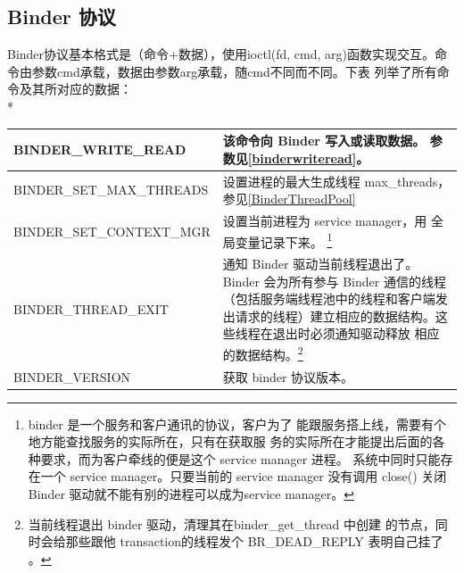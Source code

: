 \documentclass[a4paper,11pt]{article}
\begin{document}
\subsection{Binder 协议}\label{protocol}
Binder协议基本格式是（命令+数据），使用ioctl(fd, cmd,
arg)函数实现交互。命令由参数cmd承载，数据由参数arg承载，随cmd不同而不同。下表
列举了所有命令及其所对应的数据：\\*
\begin{minipage}{\textwidth}
\footnotesize
\begin{tabular}{|p{}|p{}|}\hline
    BINDER_WRITE_READ & 该命令向 Binder 写入或读取数据。
    参数见\ref{binderwriteread}。\\\hline

    BINDER_SET_MAX_THREADS & 设置进程的最大生成线程 max_threads，
    参见\ref{BinderThreadPool}\\\hline

    BINDER_SET_CONTEXT_MGR & 设置当前进程为 service manager，用
        全局变量记录下来。 \footnote{binder 是一个服务和客户通讯的协议，客户为了
        能跟服务搭上线，需要有个地方能查找服务的实际所在，只有在获取服
        务的实际所在才能提出后面的各种要求，而为客户牵线的便是这个
        service manager 进程。
        系统中同时只能存在一个 service manager。只要当前的 service manager
        没有调用 close() 关闭 Binder 驱动就不能有别的进程可以成为service manager。}
        \\\hline
    BINDER_THREAD_EXIT & 通知 Binder 驱动当前线程退出了。 Binder 会为所有参与
    Binder 通信的线程（包括服务端线程池中的线程和客户端发出请求的线程）建立相应的数据结构。这些线程在退出时必须通知驱动释放
    相应的数据结构。\footnote{当前线程退出 binder 驱动，清理其在binder_get_thread 中创建
    的节点，同时会给那些跟他 transaction的线程发个 BR_DEAD_REPLY 表明自己挂了
    。}\\\hline

    BINDER_VERSION & 获取 binder 协议版本。\\\hline

\end{tabular}
\end{minipage}

\end{document}
